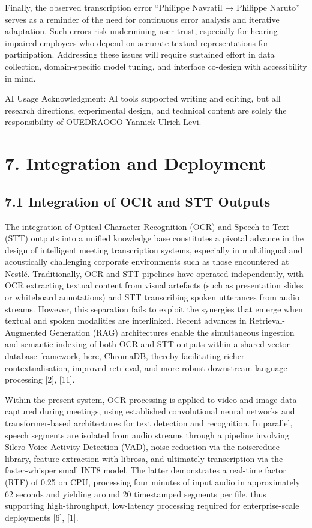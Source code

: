 \documentclass[12pt,a4paper]{article}
\begin{document}
Finally, the observed transcription error “Philippe Navratil → Philippe Naruto” serves as a reminder of the need for continuous error analysis and iterative adaptation. Such errors risk undermining user trust, especially for hearing-impaired employees who depend on accurate textual representations for participation. Addressing these issues will require sustained effort in data collection, domain-specific model tuning, and interface co-design with accessibility in mind.


AI Usage Acknowledgment: AI tools supported writing and editing, but all research directions, experimental design, and technical content are solely the responsibility of OUEDRAOGO Yannick Ulrich Levi.


\section{7. Integration and Deployment}


\subsection{7.1 Integration of OCR and STT Outputs}


The integration of Optical Character Recognition (OCR) and Speech-to-Text (STT) outputs into a unified knowledge base constitutes a pivotal advance in the design of intelligent meeting transcription systems, especially in multilingual and acoustically challenging corporate environments such as those encountered at Nestlé. Traditionally, OCR and STT pipelines have operated independently, with OCR extracting textual content from visual artefacts (such as presentation slides or whiteboard annotations) and STT transcribing spoken utterances from audio streams. However, this separation fails to exploit the synergies that emerge when textual and spoken modalities are interlinked. Recent advances in Retrieval-Augmented Generation (RAG) architectures enable the simultaneous ingestion and semantic indexing of both OCR and STT outputs within a shared vector database framework, here, ChromaDB, thereby facilitating richer contextualisation, improved retrieval, and more robust downstream language processing [2], [11].


Within the present system, OCR processing is applied to video and image data captured during meetings, using established convolutional neural networks and transformer-based architectures for text detection and recognition. In parallel, speech segments are isolated from audio streams through a pipeline involving Silero Voice Activity Detection (VAD), noise reduction via the noisereduce library, feature extraction with librosa, and ultimately transcription via the faster-whisper small INT8 model. The latter demonstrates a real-time factor (RTF) of 0.25 on CPU, processing four minutes of input audio in approximately 62 seconds and yielding around 20 timestamped segments per file, thus supporting high-throughput, low-latency processing required for enterprise-scale deployments [6], [1].
\end{document}
